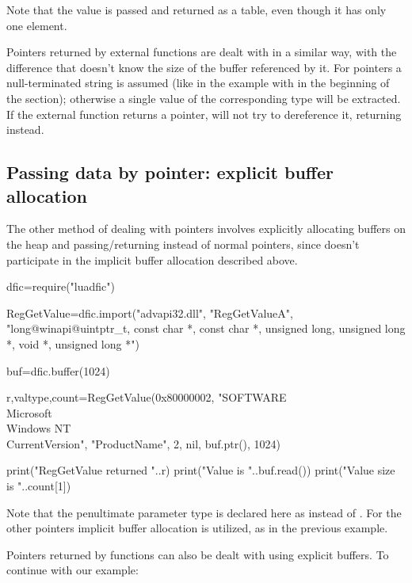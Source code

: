 \documentclass[a4paper,12pt,twoside,extrafontsizes]{memoir}
\begin{document}
Note that the  value is passed and returned as a table, even though it has only one element.

Pointers returned by external functions are dealt with in a similar way, with the difference that  doesn't know the size of the buffer referenced by it. For  pointers a null-terminated string is assumed (like in the example with  in the beginning of the section); otherwise a single value of the corresponding type will be extracted. If the external function returns a  pointer,  will not try to dereference it, returning  instead.

\subsection{Passing data by pointer: explicit buffer allocation}
\label{subsec:dficpointers2}

The other method of dealing with pointers involves explicitly allocating buffers on the heap and passing/returning  instead of normal pointers, since  doesn't participate in the implicit buffer allocation described above.

\begin{breakshellcmds}\begin{luacode}
dfic=require("luadfic")

RegGetValue=dfic.import("advapi32.dll", "RegGetValueA", "long@winapi@uintptr_t, const char *, const char *, unsigned long, unsigned long *, void *, unsigned long *")

buf=dfic.buffer(1024)

r,valtype,count=RegGetValue(0x80000002, "SOFTWARE\\Microsoft\\Windows NT\\CurrentVersion", "ProductName", 2, nil, buf.ptr(), {1024})

print("RegGetValue returned "..r)
print("Value is "..buf.read())
print("Value size is "..count[1])
\end{luacode}\end{breakshellcmds}

Note that the penultimate parameter type is declared here as  instead of . For the other pointers implicit buffer allocation is utilized, as in the previous example.

Pointers returned by functions can also be dealt with using explicit buffers. To continue with our  example:
\end{document}
